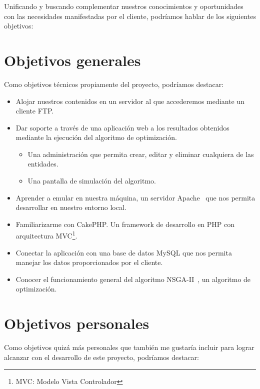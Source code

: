 
Unificando y buscando complementar nuestros conocimientos y oportunidades con las necesidades manifestadas por el cliente, podríamos hablar de los siguientes objetivos:

\section{Objetivos generales}

Como objetivos técnicos propiamente del proyecto, podríamos destacar:

\begin{itemize}
	\item Alojar nuestros contenidos en un servidor al que accederemos mediante un cliente FTP.
	
	\item Dar soporte a través de una aplicación web a los resultados obtenidos mediante la ejecución del algoritmo de optimización.
	\begin{itemize}
		\item Una administración que permita crear, editar y eliminar cualquiera de las entidades.
		\item Una pantalla de simulación del algoritmo.
	\end{itemize}
	\item Aprender a emular en nuestra máquina, un servidor Apache~\cite{libro:apache} que nos permita desarrollar en nuestro entorno local.
	
	\item Familiarizarme con CakePHP. Un framework de desarrollo en PHP con arquitectura MVC\cite{libro:patrones}\footnote{MVC: Modelo Vista Controlador}.
	
	\item Conectar la aplicación con una base de datos MySQL que nos permita manejar los datos proporcionados por el cliente.
	
	\item Conocer el funcionamiento general del algoritmo NSGA-II~\cite{pdf:nsga-ii}, un algoritmo de optimización.
\end{itemize}

\section{Objetivos personales}

Como objetivos quizá más personales que también me gustaría incluir para lograr alcanzar con el desarrollo de este proyecto, podríamos destacar:

